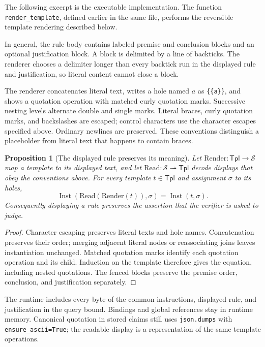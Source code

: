 \documentclass[11pt,twoside]{article}
\newtheorem{proposition}[theorem]{Proposition}
\theoremstyle{definition}
\newcommand{\Stext}{\mathcal S}
\newcommand{\Tpl}{\mathsf{Tpl}}
\newcommand{\Inst}{\operatorname{Inst}}
\begin{document}
The following excerpt is the executable implementation. The function
\texttt{render\_template}, defined earlier in the same file, performs the
reversible template rendering described below.

In general, the rule body contains labeled premise and conclusion blocks and
an optional justification block. A block is delimited by a line of backticks. The renderer
chooses a delimiter longer than every backtick run in the displayed rule and
justification, so literal content cannot close a block.

The renderer concatenates literal text, writes a hole named $a$ as
\texttt{\{\{a\}\}}, and shows a quotation operation with matched curly
quotation marks. Successive nesting levels alternate double and single marks.
Literal braces, curly quotation marks, and backslashes are escaped; control
characters use the character escapes specified above. Ordinary newlines are
preserved. These conventions distinguish a placeholder from literal text
that happens to contain braces.

\begin{proposition}[The displayed rule preserves its meaning]
Let $\mathrm{Render}:\Tpl\to\Stext$ map a template to its displayed text, and
let $\mathrm{Read}:\Stext\rightharpoonup\Tpl$ decode displays that obey the
conventions above. For every template $t\in\Tpl$ and assignment $\sigma$ to
its holes,
\begin{equation}
\Inst(\mathrm{Read}(\mathrm{Render}(t)),\sigma)=\Inst(t,\sigma).
\end{equation}
Consequently displaying a rule preserves the assertion that the verifier
is asked to judge.
\end{proposition}
\begin{proof}
Character escaping preserves literal texts and hole names. Concatenation
preserves their order; merging adjacent literal nodes or reassociating joins
leaves instantiation unchanged. Matched quotation marks identify each
quotation operation and its child. Induction on the template therefore gives
the equation, including nested quotations. The fenced blocks preserve the
premise order, conclusion, and justification separately.
\end{proof}
The runtime includes every byte of the common instructions, displayed rule,
and justification in the query bound. Bindings and global references stay in
runtime memory. Canonical quotation in stored claims still uses
\texttt{json.dumps} with \texttt{ensure\_ascii=True}; the readable display is
a representation of the same template operations.
\end{document}
